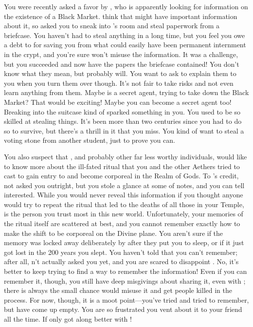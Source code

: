 \documentclass[char]{GL2020}
\begin{document}
You were recently asked a favor by \cWildCard{}, who is apparently looking for information on the existence of a Black Market. \cWildCard{\they} think\cWildCard{\plural} that \cBunker{\full} might have important information about it, so \cWildCard{\they} asked you to sneak into \cBunker{}'s room and steal paperwork from a briefcase. You haven't had to steal anything in a long time, but you feel you owe a debt to \cWildCard{} for saving you from what could easily have been permanent internment in the crypt, and you're sure \cWildCard{\they} won't misuse the information. It was a challenge, but you succeeded and now have the papers the briefcase contained! You don't know what they mean, but \cWildCard{} probably will. You want to ask \cWildCard{} to explain them to you when you turn them over though. It's not fair to take risks and not even learn anything from them. Maybe \cWildCard{} is a secret agent, trying to take down the Black Market? That would be exciting! Maybe you can become a secret agent too! Breaking into the suitcase kind of sparked something in you. You used to be so skilled at stealing things. It's been more than two centuries since you had to do so to survive, but there's a thrill in it that you miss. You kind of want to steal a voting stone from another student, just to prove you can.

You also suspect that \cWildCard{}, and probably other far less worthy individuals, would like to know more about the ill-fated ritual that you and the other Aethers tried to cast to gain entry to and become corporeal in the Realm of Gods. To \cWildCard{}'s credit, \cWildCard{\they} \cWildCard{\have} not asked you outright, but you stole a glance at some of  notes, and you can tell \cWildCard{\theyare} interested. While you would never reveal this information if you thought anyone would try to repeat the ritual that led to the deaths of all those in your Temple, \cWildCard{} is the person you trust most in this new world. Unfortunately, your memories of the ritual itself are scattered at best, and you cannot remember exactly how to make the shift to be corporeal on the Divine plane. You aren't sure if the memory was locked away deliberately by \cDisneyMentor{} after they put you to sleep, or if it just got lost in the 200 years you slept. You haven't told \cWildCard{} that you can't remember; after all, \cWildCard{\they} \cWildCard{\have}n't actually asked you yet, and you are scared to disappoint \cWildCard{\them}. No, it's better to keep trying to find a way to remember the information! Even if you can remember it, though, you still have deep misgivings about sharing it, even with \cWildCard{}; there is always the small chance \cWildCard{\they} would misuse it and get people killed in the process. For now, though, it is a moot point---you've tried and tried to remember, but have come up empty. You are so frustrated you vent about it to your friend \cTechStar{} all the time. If only \cTechStar{\they} got along better with \cWildCard{}!
\end{document}
